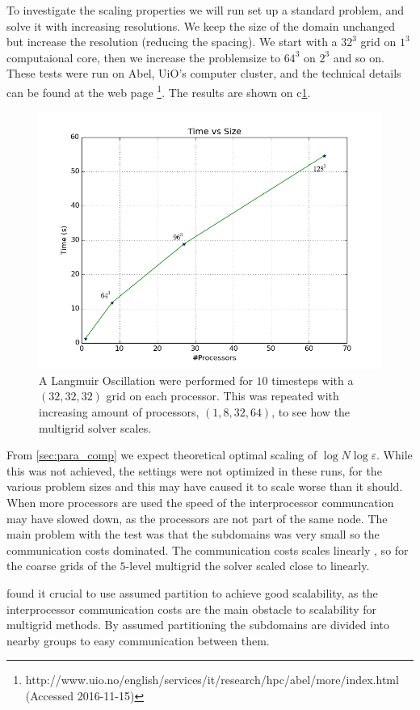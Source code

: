 	To investigate the scaling properties we will run set up a standard problem,
	and solve it with increasing resolutions. We keep the size of the domain unchanged but increase the resolution (reducing the spacing). We start with a \(32^3\) grid on
 	\(1^3\) computaional core, then we increase the problemsize to \(64^3\) on \(2^3\)
	and so on. These tests were run on Abel, UiO's computer cluster, and the technical details
	can be found at the web page \footnote{http://www.uio.no/english/services/it/research/hpc/abel/more/index.html (Accessed 2016-11-15)}.
	The results are shown on c\ref{fig:scalingMG}.
	\begin{figure}
		\label{fig:scalingMG}
		\includegraphics[width = \textwidth]{figures/performance/scalingMG}
		\caption{A Langmuir Oscillation were performed for \(10\) timesteps with a \((32,32,32)\) grid on each processor.
		This was repeated with increasing amount of processors, \((1, 8, 32, 64)\), to see how the multigrid solver scales.}
	\end{figure}
	From \cref{sec:para_comp} we expect theoretical optimal scaling of \(\log{N}\log{\varepsilon}\).
	While this was not achieved, the settings were not optimized in these runs, for the various problem sizes and
	this may have caused it to scale worse than it should. When more processors are used the speed of
	the interprocessor communcation may have slowed down, as the processors are not part of the
	same node. The main problem with the test was that the subdomains was very small so
	the communication costs dominated. The communication costs scales linearly \citep{jung_parallelization_1997}, so
	for the coarse grids of the \(5\)-level multigrid the solver scaled close to linearly.

	\citet{baker_scaling_2012} found it crucial to use assumed partition
	to achieve good scalability, as the interprocessor communication costs are the main obstacle to
	scalability for multigrid methods. By assumed partitioning the subdomains are divided into nearby groups
	to easy communication between them.
